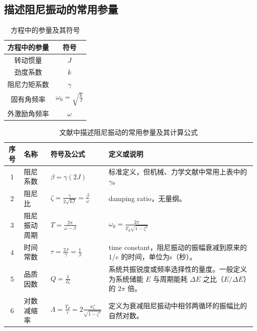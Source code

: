 \documentclass[12pt,a4paper]{amsart}
\begin{document}
\subsection{描述阻尼振动的常用参量}

\begin{table}[H]
	\centering
	\caption{方程中的参量及其符号}
	\begin{tabular}{cc}
		\toprule
		方程中的参量 & 符号                            \\
		\midrule
		转动惯量     & $J$                             \\
		劲度系数     & $k$                             \\
		阻尼力矩系数 & $\gamma$                        \\
		固有角频率   & $\omega_0 = \sqrt{\frac{k}{J}}$ \\
		外激励角频率 & $\omega$                        \\
		\bottomrule
	\end{tabular}
	\label{chart:1}
\end{table}

\begin{table}[H]
	\centering
	\caption{文献中描述阻尼振动的常用参量及其计算公式}
	\begin{tabular}{cp{3cm}p{3.5cm}p{6.5cm}}
		\toprule
		序号 & 名称         & 符号及公式                                                        & 定义或说明                                                                                                      \\
		\midrule
		1    & 阻尼系数     & $\beta = \gamma (2J)$                                             & 标准定义，但机械、力学文献中常用上表中的 $\gamma$。                                                             \\
		2    & 阻尼比       & $\zeta = \frac{\gamma}{2 \sqrt{kJ}} = \frac{\beta}{\omega}$       & damping ratio，无量纲。                                                                                         \\
		3    & 阻尼振动周期 & $T = \frac{2\pi}{\omega - \beta}$                                 & $\omega_0=\frac{2\pi}{T_d\sqrt{1-\zeta^2}}$                                                                     \\
		4    & 时间常数     & $\tau = \frac{2J}{\gamma} = \frac{1}{\beta}$                      & time constant，阻尼振动的振幅衰减到原来的 $1/e$ 的时间，单位为s（秒）。                                         \\
		5    & 品质因数     & $Q = \frac{1}{2\zeta}$                                            & 系统共振锐度或频率选择性的量度。一般定义为系统储能 $E$ 与周期能耗 $\Delta E$ 之比（$E/\Delta E$）的 $2\pi$ 倍。 \\
		6    & 对数减缩率   & $\Lambda = \frac{T_d}{\tau} = 2\frac{\pi\zeta}{\sqrt{1-\zeta^2}}$ & 定义为衰减阻尼振动中相邻两循环的振幅比的自然对数。                                                              \\
		\bottomrule
	\end{tabular}
	\label{chart:2}
\end{table}
\end{document}
